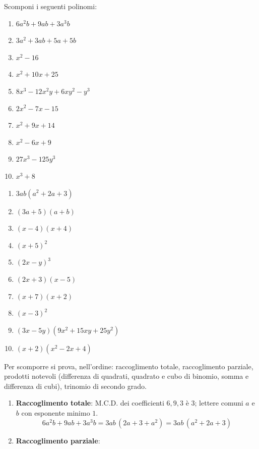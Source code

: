 \begin{question}[ID=1.2, subtitle={Scomposizione di polinomi — serie 2}, tags={scomposizione, prodotti notevoli}, difficulty=facile]
Scomponi i seguenti polinomi:
\begin{enumerate}
  \item $6a^2b + 9ab + 3a^3b$
  \item $3a^2 + 3ab + 5a + 5b$
  \item $x^2 - 16$
  \item $x^2 + 10x + 25$
\color{gray}  \item $8x^3 - 12x^2y + 6xy^2 - y^3$
\color{gray}  \item $2x^2 - 7x - 15$
\color{black}  \item $x^2+9x+14$
\color{gray}  \item $x^2 - 6x + 9$
\color{gray}  \item $27x^3 - 125y^3$
\color{black}  \item $x^3 + 8$
\end{enumerate}
\begin{solution}
\begin{enumerate}
    \item $3ab(a^2+2a+3)$
    \item $(3a+5)(a+b)$
    \item $(x-4)(x+4)$
    \item $(x+5)^2$
    \item $(2x-y)^3$
    \item $(2x+3)(x-5)$
    \item $(x+7)(x+2)$
    \item $(x-3)^2$
    \item $(3x-5y)(9x^2+15xy+25y^2)$
    \item $(x+2)(x^2-2x+4)$
\end{enumerate}
\end{solution}
\begin{explanation}
Per scomporre si prova, nell'ordine: raccoglimento totale, raccoglimento parziale, prodotti notevoli (differenza di quadrati, quadrato e cubo di binomio, somma e differenza di cubi), trinomio di secondo grado.
\begin{enumerate}
    \item \textbf{Raccoglimento totale}: M.C.D. dei coefficienti $6,9,3$ è $3$; lettere comuni $a$ e $b$ con esponente minimo $1$.
    \[ 6a^2b+9ab+3a^3b=3ab\,(2a+3+a^2)=3ab\,(a^2+2a+3) \]
    \item \textbf{Raccoglimento parziale}:
    \[\begin{aligned}

\end{aligned}\]
\end{enumerate}
\end{explanation}
\end{question}
